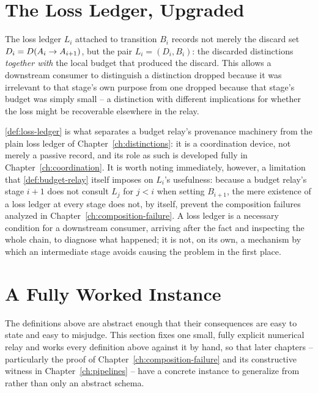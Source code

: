 \section{The Loss Ledger, Upgraded}

\begin{definition}
\label{def:loss-ledger}
The loss ledger $L_i$ attached to transition $B_i$ records not merely the
discard set $D_i = D(A_i \to A_{i+1})$, but the pair $L_i = (D_i,
B_i)$: the discarded distinctions \emph{together with} the local budget
that produced the discard. This allows a downstream consumer to
distinguish a distinction dropped because it was irrelevant to that
stage's own purpose from one dropped because that stage's budget was
simply small -- a distinction with different implications for whether the
loss might be recoverable elsewhere in the relay.
\end{definition}

\cref{def:loss-ledger} is what separates a budget relay's provenance
machinery from the plain loss ledger of Chapter~\ref{ch:distinctions}: it
is a coordination device, not merely a passive record, and its role as
such is developed fully in Chapter~\ref{ch:coordination}. It is worth
noting immediately, however, a limitation that \cref{def:budget-relay}
itself imposes on $L_i$'s usefulness: because a budget relay's stage $i+1$
does not consult $L_j$ for $j < i$ when setting $B_{i+1}$, the mere
existence of a loss ledger at every stage does not, by itself, prevent the
composition failures analyzed in Chapter~\ref{ch:composition-failure}. A
loss ledger is a necessary condition for a downstream consumer, arriving
after the fact and inspecting the whole chain, to diagnose what happened;
it is not, on its own, a mechanism by which an intermediate stage avoids
causing the problem in the first place.

\section{A Fully Worked Instance}
\label{sec:worked-relay}

The definitions above are abstract enough that their consequences are easy
to state and easy to misjudge. This section fixes one small, fully
explicit numerical relay and works every definition above against it by
hand, so that later chapters -- particularly the proof of
Chapter~\ref{ch:composition-failure} and its constructive witness in
Chapter~\ref{ch:pipelines} -- have a concrete instance to generalize from
rather than only an abstract schema.

